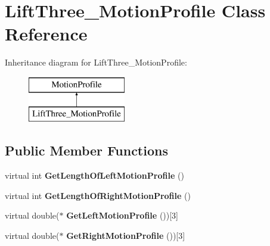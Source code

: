 \hypertarget{class_lift_three___motion_profile}{}\section{Lift\+Three\+\_\+\+Motion\+Profile Class Reference}
\label{class_lift_three___motion_profile}
Inheritance diagram for Lift\+Three\+\_\+\+Motion\+Profile\+:\begin{figure}[H]
\begin{center}
\leavevmode
\includegraphics[height=2.000000cm]{class_lift_three___motion_profile}
\end{center}
\end{figure}
\subsection*{Public Member Functions}
\begin{DoxyCompactItemize}
\item 
\mbox{\label{class_lift_three___motion_profile_a0fd9d60707d0479290a168a4686cd22a}} 
virtual int {\bfseries Get\+Length\+Of\+Left\+Motion\+Profile} ()
\item 
\mbox{\label{class_lift_three___motion_profile_ae3ee694eef88dab61c48a5e32e09657d}} 
virtual int {\bfseries Get\+Length\+Of\+Right\+Motion\+Profile} ()
\item 
\mbox{\label{class_lift_three___motion_profile_a8697de71677b1ce2aaf06c7220d8f6aa}} 
virtual double($\ast$ {\bfseries Get\+Left\+Motion\+Profile} ())\mbox{[}3\mbox{]}
\item 
\mbox{\label{class_lift_three___motion_profile_ac08df00ab2c8cce31ba6aa5189d2c05a}} 
virtual double($\ast$ {\bfseries Get\+Right\+Motion\+Profile} ())\mbox{[}3\mbox{]}
\end{DoxyCompactItemize}
